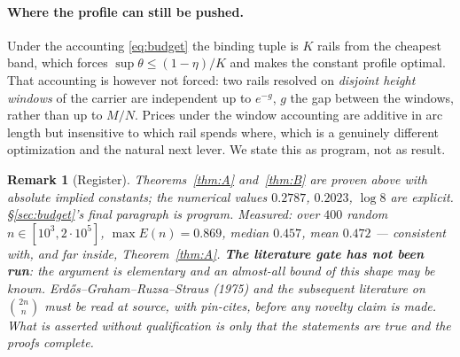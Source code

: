 \documentclass[11pt]{article}
\newtheorem{remark}[theorem]{Remark}
\begin{document}
\paragraph{Where the profile can still be pushed.}
Under the accounting \eqref{eq:budget} the binding tuple is $K$ rails from the cheapest
band, which forces $\sup\theta\le(1-\eta)/K$ and makes the constant profile optimal.  That
accounting is however not forced: two rails resolved on \emph{disjoint height windows} of
the carrier are independent up to $e^{-g}$, $g$ the gap between the windows, rather than up
to $M/N$.  Prices under the window accounting are additive in arc length but insensitive to
which rail spends where, which is a genuinely different optimization and the natural next
lever.  We state this as program, not as result.

\begin{remark}[Register]
Theorems~\ref{thm:A} and~\ref{thm:B} are \emph{proven} above with absolute implied
constants; the numerical values $0.2787$, $0.2023$, $\log8$ are explicit.
\S\ref{sec:budget}'s final paragraph is \emph{program}.  \emph{Measured}: over $400$
random $n\in[10^{3},2\cdot10^{5}]$, $\max E(n)=0.869$, median $0.457$, mean $0.472$ ---
consistent with, and far inside, Theorem~\ref{thm:A}.  \textbf{The literature gate has not
been run}: the argument is elementary and an almost-all bound of this shape may be known.
Erd\H{o}s--Graham--Ruzsa--Straus (1975) and the subsequent literature on
$\binom{2n}{n}$ must be read at source, with pin-cites, before any novelty claim is made.
What is asserted without qualification is only that the statements are true and the proofs
complete.
\end{remark}
\end{document}
